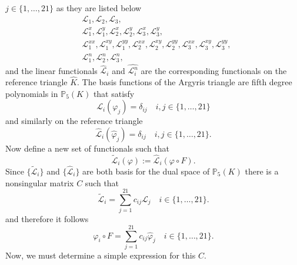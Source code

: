 $j\in\{1,\dots,21\}$ as they are listed below
\begin{align*}
  &\mathcal{L}_1, \mathcal{L}_2, \mathcal{L}_3, \\
  &\mathcal{L}_1^x, \mathcal{L}_1^y, \mathcal{L}_2^x, \mathcal{L}_2^y,
    \mathcal{L}_3^x, \mathcal{L}_3^y, \\
  &\mathcal{L}_1^{xx}, \mathcal{L}_1^{xy}, \mathcal{L}_1^{yy},
    \mathcal{L}_2^{xx}, \mathcal{L}_2^{xy}, \mathcal{L}_2^{yy},
    \mathcal{L}_3^{xx}, \mathcal{L}_3^{xy}, \mathcal{L}_3^{yy}, \\
  &\mathcal{L}_1^n, \mathcal{L}_2^n, \mathcal{L}_3^n,
\end{align*}
and the linear functionals $\hat{\mathcal{L}}_i$ and $\hat{ \mathcal{L}_i^n}$
are the corresponding functionals on the reference triangle $\hat{K}$. The basis
functions of the Argyris triangle are fifth degree polynomials in
$\mathbb{P}_5(K)$
that satisfy
\begin{equation*}
  \mathcal{L}_i(\varphi_j) = \delta_{ij} \quad i,j\in\{1,\dots,21\}
\end{equation*}
and similarly on the reference triangle
\begin{equation*}
  \hat{\mathcal{L}}_i(\hat{\varphi}_j) = \delta_{ij} \quad
  i,j\in\{1,\dots,21\}.
\end{equation*}
Now define a new set of functionals such that
\begin{equation}
  \tilde{\mathcal{L}}_i(\varphi) := \hat{\mathcal{L}}_i(\varphi\circ F).
  \label{eqn:Functional}
\end{equation}
Since $\{\tilde{\mathcal{L}}_i\}$ and $\{\hat{\mathcal{L}}_i\}$ are both basis
for the dual space of $\mathbb{P}_5(K)$ there is a nonsingular matrix $C$ such
that
\begin{equation}
  \tilde{\mathcal{L}}_i = \sum_{j=1}^{21} c_{ij} \mathcal{L}_j \quad i\in
  \{1,\dots,21\}.
  \label{eqn:FunctionalsC}
\end{equation}
and therefore it follows
\begin{equation}
  \varphi_i\circ F = \sum_{j=1}^{21} c_{ij}\hat{\varphi}_j \quad i\in
  \{1,\dots,21\}.
  \label{eqn:PolyC}
\end{equation} \cite{Dominguez08}
Now, we must determine a simple expression for this $C$.

